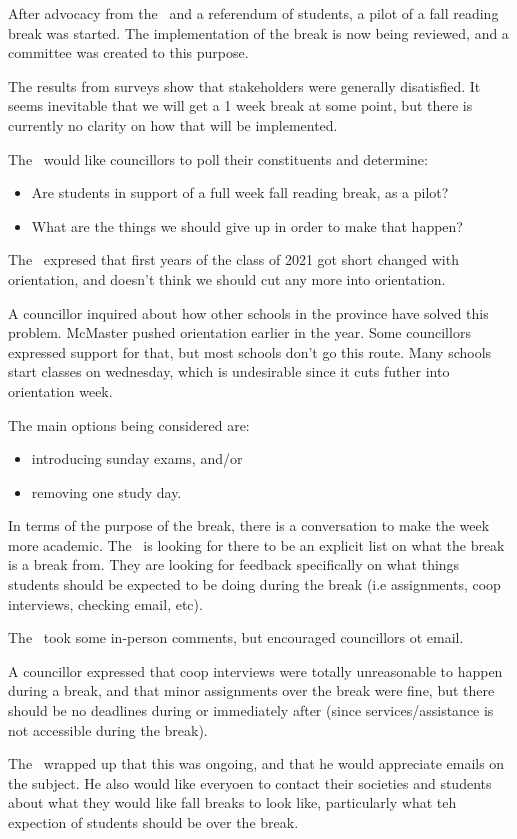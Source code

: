 \begin{information}

After advocacy from the \vpe\ and a referendum of students, a pilot of a fall
reading break was started. The implementation of the break is now being 
reviewed, and a committee was created to this purpose.  

The results from surveys show that stakeholders were generally disatisfied. 
It seems inevitable that we will get a 1 week break at some point, but 
there is currently no clarity on how that will be implemented. 

The \vpe\ would like councillors to poll their constituents and determine:
\begin{itemize}
    \item Are students in support of a full week fall reading break, as a pilot? 
    \item What are the things we should give up in order to make that happen? 
\end{itemize}

The \vpe\ expresed that first years of the class of 2021 got short changed 
with orientation, and doesn't think we should cut any more into orientation. 

A councillor inquired about how other schools in the province have solved this 
problem. McMaster pushed orientation earlier in the year. Some councillors 
expressed support for that, but most schools don't go this route.  Many 
schools start classes on wednesday, which is undesirable since it cuts futher
into orientation week. 

The main options being considered are:
\begin{itemize}
    \item introducing sunday exams, and/or 
    \item removing one study day.
\end{itemize}

In terms of the purpose of the break, there is a conversation to make the week
more academic. The \vpe\ is looking for there to be an explicit list on what 
the break is a break from. They are looking for feedback specifically on 
what things students should be expected to be doing  during the break (i.e 
assignments, coop interviews, checking email, etc).

The \vpe\ took some in-person comments, but encouraged councillors ot email. 

A councillor expressed that coop interviews were totally unreasonable to happen
during a break, and that minor assignments over the break were fine, but there
should be no deadlines during or immediately after (since
services/assistance is not accessible during the break).  

The \vpe\ wrapped up that this was ongoing, and that he would appreciate
emails on the subject. He also would 
like everyoen to contact their societies and students about what they would
like fall breaks to look like, particularly what teh expection of students
should be over the break. 

\end{information}
    
